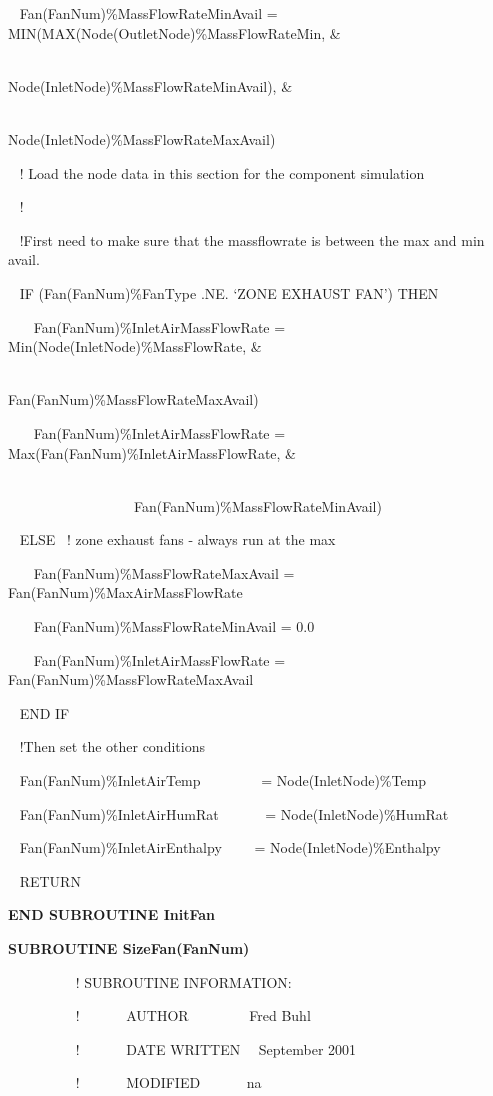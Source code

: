 ~ Fan(FanNum)\%MassFlowRateMinAvail = MIN(MAX(Node(OutletNode)\%MassFlowRateMin, \&

~~~~~~~~~~~~~~~~~~~~~~~~~~~~~~~~~~~~~~~~~~~~ Node(InletNode)\%MassFlowRateMinAvail), \&

~~~~~~~~~~~~~~~~~~~~~~~~~~~~~~~~~~~~~~~~~~~~ Node(InletNode)\%MassFlowRateMaxAvail)

~ ! Load the node data in this section for the component simulation

~ !

~ !First need to make sure that the massflowrate is between the max and min avail.

~ IF (Fan(FanNum)\%FanType .NE. `ZONE EXHAUST FAN') THEN

~~~ Fan(FanNum)\%InletAirMassFlowRate = Min(Node(InletNode)\%MassFlowRate, \&

~~~~~~~~~~~~~~~~~~~~~~~~~~~~~~~~~~~~~~~~~~ Fan(FanNum)\%MassFlowRateMaxAvail)

~~~ Fan(FanNum)\%InletAirMassFlowRate = Max(Fan(FanNum)\%InletAirMassFlowRate, \&

~~~~~~~~~~~~~~~~~~~~~~~~ ~~~~~~~~~~~~~~~~~~Fan(FanNum)\%MassFlowRateMinAvail)

~ ELSE~ ! zone exhaust fans - always run at the max

~~~ Fan(FanNum)\%MassFlowRateMaxAvail = Fan(FanNum)\%MaxAirMassFlowRate

~~~ Fan(FanNum)\%MassFlowRateMinAvail = 0.0

~~~ Fan(FanNum)\%InletAirMassFlowRate = Fan(FanNum)\%MassFlowRateMaxAvail

~ END IF

~ !Then set the other conditions

~ Fan(FanNum)\%InletAirTemp~~~~~~~~ = Node(InletNode)\%Temp

~ Fan(FanNum)\%InletAirHumRat~~~~~~ = Node(InletNode)\%HumRat

~ Fan(FanNum)\%InletAirEnthalpy~~~~ = Node(InletNode)\%Enthalpy

~ RETURN

\textbf{END SUBROUTINE InitFan}

\textbf{SUBROUTINE SizeFan(FanNum)}

~~~~~~~~~ ! SUBROUTINE INFORMATION:

~~~~~~~~~ !~~~~~~ AUTHOR~~~~~~~~ Fred Buhl

~~~~~~~~~ !~~~~~~ DATE WRITTEN~~ September 2001

~~~~~~~~~ !~~~~~~ MODIFIED~~~~~~ na

